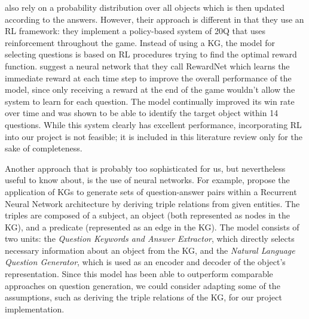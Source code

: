 \documentclass[11pt,a4paper]{article}
\begin{document}
\citet{HuEa2018} also rely on a probability distribution over all objects which is then updated according to the answers.
However, their approach is different in that they use an RL framework: they implement a policy-based system of 20Q that uses reinforcement throughout the game. 
Instead of using a KG, the model for selecting questions is based on RL procedures trying to find the optimal reward function. 
\citet{HuEa2018} suggest a neural network that they call RewardNet which learns the immediate reward at each time step to improve the overall performance of the model, since only receiving a reward at the end of the game wouldn't allow the system to learn for each question.
The model continually improved its win rate over time and was shown to be able to identify the target object within 14 questions.
While this system clearly has excellent performance, incorporating RL into our project is not feasible; it is included in this literature review only for the sake of completeness.

Another approach that is probably too sophisticated for us, but nevertheless useful to know about, is the use of neural networks.
For example, \citet{ReddyEa2017} propose the application of KGs to generate sets of question-answer pairs within a Recurrent Neural Network architecture by deriving triple relations from given entities. 
The triples are composed of a subject, an object (both represented as nodes in the KG), and a predicate (represented as an edge in the KG). 
The model consists of two units: the \textit{Question Keywords and Answer Extractor}, which directly selects necessary information about an object from the KG, and the \textit{Natural Language Question Generator}, which is used as an encoder and decoder of the object's representation. 
Since this model has been able to outperform comparable approaches on question generation, we could consider adapting some of the assumptions, such as deriving the triple relations of the KG, for our project implementation. 
\end{document}
